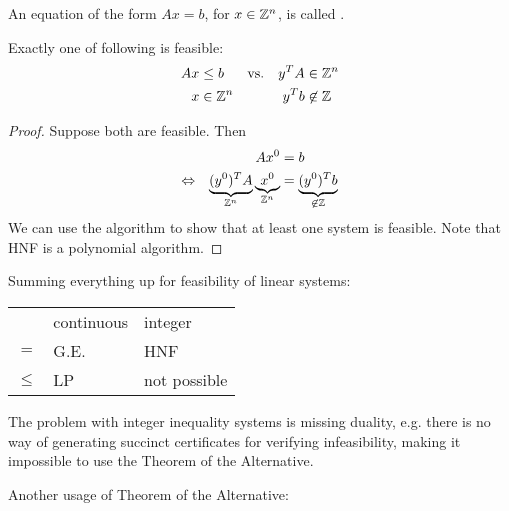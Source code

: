 \begin{definition}
    An equation of the form $Ax=b$, for $x \in \mathbb{Z}^n$, is called .
\end{definition}
\begin{theorem}
    Exactly one of following is feasible:
    \begin{align*}
        Ax & \leq b          & \text{vs.} &  & y^TA & \in \mathbb{Z}^n    \\
        x  & \in \mathbb{Z}^n &            &  & y^Tb & \not \in \mathbb{Z} \\
    \end{align*}
\end{theorem}
\begin{proof}
    Suppose both are feasible. Then
    \begin{align*}
                        &  & Ax^0                                                               & = b                                          \\
        \Leftrightarrow &  & \underbrace{(y^0)^TA}_{\mathbb{Z}^n} \underbrace{x^0}_{\mathbb{Z}^n} & = \underbrace{(y^0)^Tb}_{\not \in \mathbb{Z}}
    \end{align*}
    We can use the  algorithm to show that at least one system is feasible.
    Note that HNF is a polynomial algorithm.
\end{proof}
\begin{conclusion}
    Summing everything up for feasibility of linear systems:

    \begin{tabular}{lll}
                                    & continuous                & integer                           \\ \cline{2-3}
        \multicolumn{1}{l|}{$=$}    & \multicolumn{1}{l|}{G.E.} & \multicolumn{1}{l|}{HNF}          \\ \cline{2-3}
        \multicolumn{1}{l|}{$\leq$} & \multicolumn{1}{l|}{LP}   & \multicolumn{1}{l|}{not possible} \\ \cline{2-3}
    \end{tabular}

    The problem with integer inequality systems is missing duality, e.g. there is no way of generating succinct certificates for verifying infeasibility, making
    it impossible to use the Theorem of the Alternative.
\end{conclusion}
Another usage of Theorem of the Alternative:
